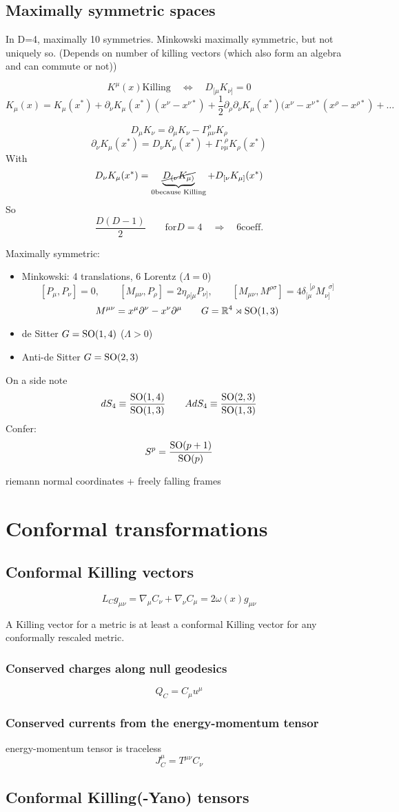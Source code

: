 \subsection{Maximally symmetric spaces}
In D=4, maximally 10 symmetries. Minkowski maximally symmetric, but not uniquely so.
(Depends on number of killing vectors (which also form an algebra and can commute or not))

\[ K^\mu(x) \text{Killing} \quad \Leftrightarrow \quad D_{[\mu}K_{\nu]} = 0 \]
\[ K_\mu(x) = K_\mu(x^*) + \partial_\nu K_\mu(x^*)(x^\nu-x^{\nu*}) + \frac{1}{2}\partial_\rho\partial_\nu K_\mu(x^*)(x^\nu-x^{\nu *}(x^\rho - x^{\rho*}) + \ldots \]

\[ D_\mu K_\nu = \partial_\mu K_\nu - \Gamma^\rho_{\mu\nu}K_\rho \]
\[ \partial_\nu K_\mu(x^*) = D_\nu K_\mu(x^*) + \Gamma_{\nu\mu}^{\;\;\rho}K_\rho(x^*) \]
With
\[ D_\nu K_\mu(x^*) = \underbrace{\cancel{D_{(\nu}K_{\mu)}}}_{0 \text{because Killing}} + D_{[\nu}K_{\mu]}(x^*) \]
So
\[ \frac{D(D-1)}{2} \qquad \text{for} D=4 \quad \Rightarrow \quad 6 \text{coeff.} \]

Maximally symmetric:
\begin{itemize}
\item Minkowski: 4 translations, 6 Lorentz ($\Lambda = 0$)
\[ [P_\mu, P_\nu] = 0, \qquad [M_{\mu\nu}, P_\rho] = 2 \eta_{\rho[\mu}P_{\nu]}, \qquad [M_{\mu\nu}, M^{\rho\sigma}] = 4 \delta_{[\mu}^{\;\;[\rho}M_{\nu]}^{\;\;\sigma]} \]
\[M^{\mu\nu} = x^\mu\partial^\nu - x^\nu\partial^\mu \qquad G=\mathbb{R}^4 \rtimes \operatorname{SO}(1,3)\]
\item de Sitter $G = \operatorname{SO}(1,4)$ ($\Lambda>0$)
\item Anti-de Sitter $G=\operatorname{SO}(2,3)$
\end{itemize}
On a side note
\[ dS_4 \equiv \frac{\operatorname{SO}(1,4)}{\operatorname{SO}(1,3)} \qquad AdS_4 \equiv \frac{\operatorname{SO}(2,3)}{\operatorname{SO}(1,3)} \]
Confer:
\[ S^p = \frac{\operatorname{SO}(p+1)}{\operatorname{SO}(p)} \]

riemann normal coordinates + freely falling frames

\section{Conformal transformations}
\subsection{Conformal Killing vectors}
\[ L_C g_{\mu\nu} = \nabla_\mu C_\nu + \nabla_\nu C_\mu = 2\omega(x)g_{\mu\nu} \]

A Killing vector for a metric is at least a conformal Killing vector for any conformally rescaled metric.

\subsubsection{Conserved charges along null geodesics}
\[ Q_C = C_\mu u^\mu \]
\subsubsection{Conserved currents from the energy-momentum tensor}
energy-momentum tensor is traceless
\[ J_C^\mu = T^{\mu\nu}C_\nu \]

\subsection{Conformal Killing(-Yano) tensors}

